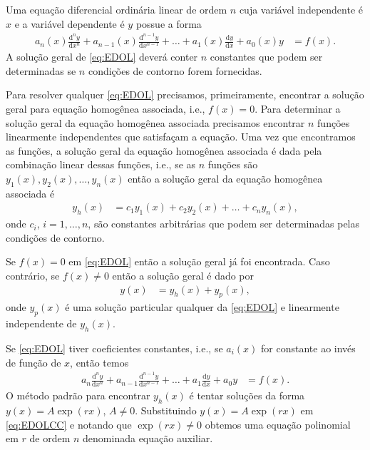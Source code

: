 \documentclass[a4paper,12pt, leqno, answers]{exam}
\begin{document}
\thispagestyle{empty}

\newpage
\setcounter{page}{1}
\nocite{Riley:2006:Mathematical}Uma equa\c{c}\~{a}o diferencial ordin\'{a}ria linear de ordem $n$ cuja vari\'{a}vel independente \'{e} $x$ e a vari\'{a}vel dependente \'{e} $y$ possue a forma
\begin{align*}
    a_n(x) \frac{\mathrm{d}^ny}{\mathrm{d}x^n} + a_{n - 1}(x) \frac{\mathrm{d}^{n - 1}y}{\mathrm{d}x^{n - 1}} + \ldots + a_1(x) \frac{\mathrm{d}y}{\mathrm{d}x} + a_0(x) y &= f(x). \tag{EDOL} \label{eq:EDOL}
\end{align*}
A solu\c{c}\~{a}o geral de \eqref{eq:EDOL} dever\'{a} conter $n$ constantes que podem ser determinadas se $n$ condi\c{c}\~{o}es de contorno forem fornecidas.

Para resolver qualquer \eqref{eq:EDOL} precisamos, primeiramente, encontrar a solu\c{c}\~{a}o geral para equa\c{c}\~{a}o homog\^{e}nea associada, i.e., $f(x) = 0$. Para determinar a solu\c{c}\~{a}o geral da equa\c{c}\~{a}o homog\^{e}nea associada precisamos encontrar $n$ fun\c{c}\~{o}es linearmente independentes que satisfa\c{c}am a equa\c{c}\~{a}o. Uma vez que encontramos as fun\c{c}\~{o}es, a solu\c{c}\~{a}o geral da equa\c{c}\~{a}o homog\^{e}nea associada \'{e} dada pela combina\c{c}\~{a}o linear dessas fun\c{c}\~{o}es, i.e., se as $n$ fun\c{c}\~{o}es s\~{a}o $y_1(x), y_2(x), \ldots, y_n(x)$ ent\~{a}o a solu\c{c}\~{a}o geral da equa\c{c}\~{a}o homog\^{e}nea associada \'{e}
\begin{align*}
    y_h(x) &= c_1 y_1(x) + c_2 y_2(x) + \ldots + c_n y_n(x),
\end{align*}
onde $c_i$, $i = 1, \ldots, n$, s\~{a}o constantes arbitr\'{a}rias que podem ser determinadas pelas condi\c{c}\~{o}es de contorno.

Se $f(x) = 0$ em \eqref{eq:EDOL} ent\~{a}o a solu\c{c}\~{a}o geral j\'{a} foi encontrada. Caso contr\'{a}rio, se $f(x) \neq 0$ ent\~{a}o a solu\c{c}\~{a}o geral \'{e} dado por
\begin{align*}
    y(x) &= y_h(x) + y_p(x),
\end{align*}
onde $y_p(x)$ \'{e} uma solu\c{c}\~{a}o particular qualquer da \eqref{eq:EDOL} e linearmente independente de $y_h(x)$.

Se \eqref{eq:EDOL} tiver coeficientes constantes, i.e., se $a_i(x)$ for constante ao inv\'{e}s de fun\c{c}\~{a}o de $x$, ent\~{a}o temos
\begin{align*}
    a_n \frac{\mathrm{d}^ny}{\mathrm{d}x^n} + a_{n - 1} \frac{\mathrm{d}^{n - 1}y}{\mathrm{d}x^{n - 1}} + \ldots + a_1 \frac{\mathrm{d}y}{\mathrm{d}x} + a_0 y &= f(x). \tag{EDOLCC} \label{eq:EDOLCC}
\end{align*}
O m\'{e}todo padr\~{a}o para encontrar $y_h(x)$ \'{e} tentar solu\c{c}\~{o}es da forma $y(x) = A \exp(r x)$, $A \neq 0$. Substituindo $y(x) = A \exp(r x)$ em \eqref{eq:EDOLCC} e notando que $\exp(r x) \neq 0$ obtemos uma equa\c{c}\~{a}o polinomial em $r$ de ordem $n$ denominada equa\c{c}\~{a}o auxiliar. %
\end{document}
